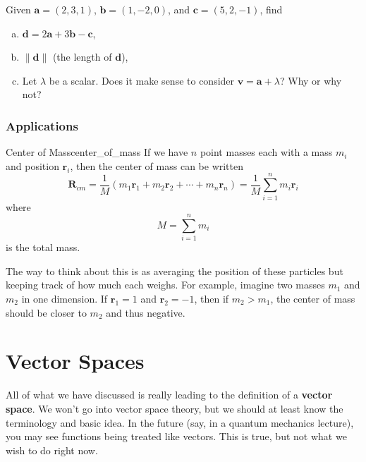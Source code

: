         \begin{exercise}
        Given $\mathbf{a}=(2,3,1)$, $\mathbf{b}=(1,-2,0)$, and $\mathbf{c}=(5,2,-1)$, find 
        \begin{enumerate}[(a)]
            \item $\mathbf{d}=2\mathbf{a}+3\mathbf{b}-\mathbf{c}$,
            \item $\|\mathbf{d}\|$ (the length of $\mathbf{d}$),
            \item Let $\lambda$ be a scalar.  Does it make sense to consider $\mathbf{v}=\mathbf{a}+\lambda$? Why or why not?
        \end{enumerate}
        \end{exercise}
        
        \subsubsection{Applications}
        
        \begin{ex}{Center of Mass}{center_of_mass}
        If we have $n$ point masses each with a mass $m_i$ and position $\mathbf{r}_i$, then the center of mass can be written
        \[
        \mathbf{R}_{cm}=\frac{1}{M}(m_1\mathbf{r}_1+m_2 \mathbf{r}_2 + \cdots + m_n \mathbf{r}_n)=\frac{1}{M}\sum_{i=1}^n m_i \mathbf{r}_i
        \]
        where
        \[
        M=\sum_{i=1}^n m_i
        \]
        is the total mass.
        
        The way to think about this is as averaging the position of these particles but keeping track of how much each weighs.  For example, imagine two masses $m_1$ and $m_2$ in one dimension.  If $\mathbf{r}_1=1$ and $\mathbf{r}_2=-1$, then if $m_2>m_1$, the center of mass should be closer to $m_2$ and thus negative.
        \end{ex}
    
        \section{Vector Spaces}
        All of what we have discussed is really leading to the definition of a \textbf{vector space}.  We won't go into vector space theory, but we should at least know the terminology and basic idea.  In the future (say, in a quantum mechanics lecture), you may see functions being treated like vectors.  This is true, but not what we wish to do right now.
        

